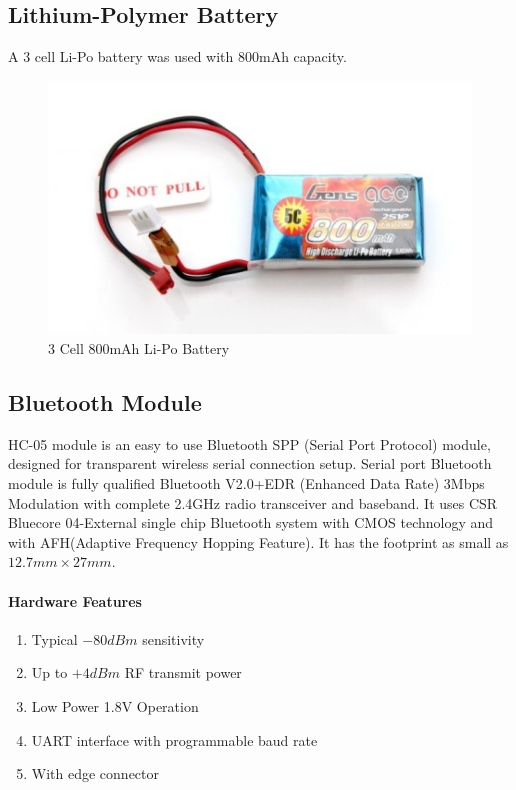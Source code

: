 \documentclass[14pt,a4paper]{extarticle}
\begin{document}
	\subsection{Lithium-Polymer Battery}
	
	A 3 cell Li-Po battery was used with 800mAh capacity.
	
	\begin{figure}[H]
		\includegraphics[center]{lipo.jpg}
		\caption{3 Cell 800mAh Li-Po Battery}
	\end{figure}
	
	
		\subsection{Bluetooth Module}
	
	HC-05 module is an easy to use Bluetooth SPP (Serial Port Protocol) module, designed for transparent wireless serial connection setup. Serial port Bluetooth module is fully qualified Bluetooth V2.0+EDR (Enhanced Data Rate) 3Mbps Modulation with complete 2.4GHz radio transceiver and baseband. It uses CSR Bluecore 04-External single chip Bluetooth system with CMOS technology and with AFH(Adaptive Frequency Hopping Feature). It has the footprint as small as  $ {12.7mm \times 27mm}$.
	
	\paragraph{Hardware Features}

	\begin{enumerate}

	\item Typical $-80dBm$ sensitivity
	\item Up to $+4dBm$ RF transmit power
	\item Low Power 1.8V Operation
	\item UART interface with programmable baud rate
	\item With edge connector
	\end{enumerate}
	
\end{document}
